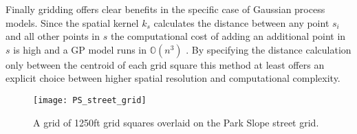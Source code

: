 
Finally gridding offers clear benefits in the specific case of Gaussian process models. Since the spatial kernel $k_s$ calculates the distance between any point $s_i$ and all other points in $s$ the computational cost of adding an additional point in $s$ is high and a GP model runs in $\mathbb{O}(n^3)$  \cite{flaxman_2015_FastKron}. By specifying the distance calculation only between the centroid of each grid square this method at least offers an explicit choice between higher spatial resolution and computational complexity.

\begin{figure}[h!]
  \caption{A grid of 1250ft grid squares overlaid on the Park Slope street grid.}
  \texttt{[image: PS\_street\_grid]}
\end{figure}
